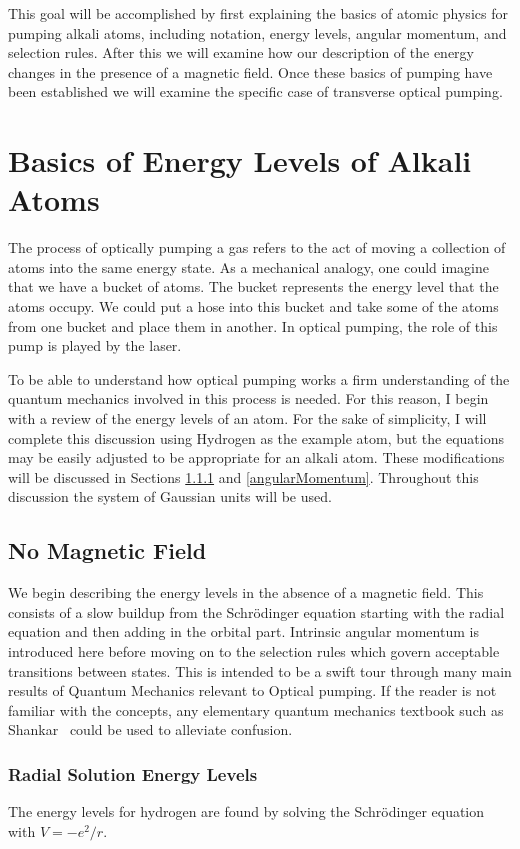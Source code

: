 \documentclass[letter,12pt]{article}
\newcommand{\schr}{Schr\"odinger}
\begin{document}
This goal will  be accomplished by first explaining the basics 
of atomic physics for pumping alkali atoms, including notation, energy
levels, angular momentum, and selection rules. After this we
will examine how our description of the energy changes in the
presence of a magnetic
field. Once these basics of pumping have been established we will
examine the specific case of transverse optical pumping. 

\section{Basics of Energy Levels of Alkali Atoms}
The process of optically pumping a gas refers to the 
act of moving a collection of atoms into the 
same energy state. As a mechanical analogy, one could
imagine that we have a bucket of atoms. The bucket 
represents the energy level that the atoms
occupy. We could put a hose into this
bucket and take some of the atoms from one bucket and
place them in another. In optical pumping, the role of 
this pump is played by the laser. 

To be able to understand how optical pumping works a firm 
understanding of the quantum mechanics involved in this 
process is needed. For this reason, I begin with a review of the energy
levels of an atom. For the sake of simplicity, I will complete
this discussion using
Hydrogen as the example atom, but the equations may be 
easily adjusted to be appropriate for an alkali atom.
These modifications will be discussed in Sections \ref{energyLevels}
and \ref{angularMomentum}. Throughout this discussion
the system of Gaussian units will be used. 
	\subsection{No Magnetic Field}
    We begin describing the energy levels in the absence of 
    a magnetic field. This consists of a slow buildup 
    from the Schr\"odinger equation starting with the radial
    equation and then adding in the orbital part. Intrinsic 
    angular momentum is introduced here before moving on to
    the selection rules which govern acceptable transitions
    between states. This is intended to be a swift tour through
	many main results of Quantum Mechanics relevant to 
	Optical pumping. If the reader is not familiar with the 
	concepts, any elementary quantum mechanics textbook
	such as Shankar~\cite{shankar} could be used to alleviate confusion.
		\subsubsection{Radial Solution Energy Levels}\label{energyLevels}
		The energy levels for hydrogen are found by solving the
		{\schr} equation with $V=-e^2/r$. 
\end{document}
